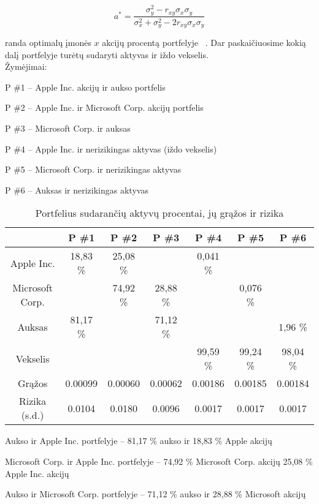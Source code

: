 \documentclass[12pt, a14paper, lithuanian]{article}
\begin{document}
\begin{equation}
a^{\ast}= \frac{\sigma_y^2 - r_{xy}\sigma_x \sigma_y}{\sigma^2_x + \sigma^2_y - 2r_{xy}\sigma_x \sigma_y} \label{form}
\end{equation}

randa optimalų įmonės $x$ akcijų procentą portfelyje ~\cite{cope}. Dar paskaičiuosime kokią dalį portfelyje turėtų sudaryti aktyvas ir iždo vekselis. \\

Žymėjimai:

P \#1 -- Apple Inc. akcijų ir aukso portfelis

P \#2 -- Apple Inc. ir Microsoft Corp. akcijų portfelis

P \#3 -- Microsoft Corp. ir auksas

P \#4 -- Apple Inc. ir nerizikingas aktyvas (iždo vekselis)

P \#5 -- Microsoft Corp. ir nerizikingas aktyvas

P \#6 -- Auksas ir nerizikingas aktyvas

\begin{table}[ht]
\begin{center}
\begin{tabular}{ccccccc}
  \hline
 & P \#1 & P \#2 & P \#3 & P \#4 & P \#5 & P \#6 \\ 
  \hline
Apple Inc. & 18,83 \% & 25,08 \% &  & 0,041 \%  & & &\\
\hline
 Microsoft Corp. &  & 74,92 \% & 28,88 \% & & 0,076 \% & & \\ 
   \hline
   Auksas & 81,17 \% & & 71,12 \% & & & 1,96 \% & \\
   \hline
   Vekselis & & & & 99,59 \% & 99,24 \% & 98,04 \% & \\
   \hline
   Grąžos & 0.00099 & 0.00060 & 0.00062 & 0.00186 & 0.00185 & 0.00184 &\\
   \hline
   Rizika (s.d.) & 0.0104 & 0.0180 & 0.0096 & 0.0017 & 0.0017 & 0.0017 &\\
   \hline
\end{tabular}
\end{center}
\caption{Portfelius sudarančių aktyvų procentai, jų grąžos ir rizika}
\end{table}

Aukso ir Apple Inc. portfelyje -- 81,17 \% aukso ir 18,83 \% Apple akcijų

Microsoft Corp. ir Apple Inc. portfelyje -- 74,92 \% Microsoft Corp. akcijų  25,08 \% Apple Inc. akcijų

Aukso ir Microsoft Corp. portfelyje -- 71,12 \% aukso ir 28,88 \% Microsoft akcijų
\end{document}
